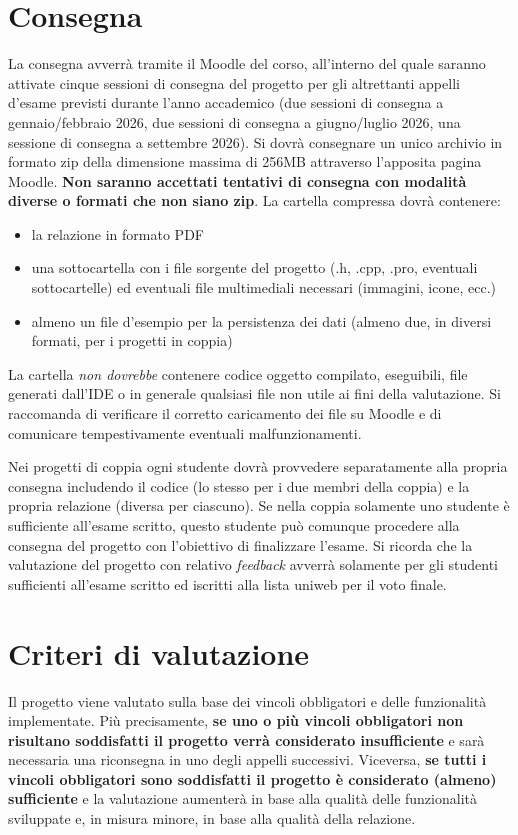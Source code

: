 \documentclass[10pt,a4paper,oneside]{article}
\begin{document}
\section{Consegna}
La consegna avverrà tramite il Moodle del corso, all'interno del quale saranno attivate cinque sessioni di consegna del progetto per gli altrettanti appelli d'esame previsti durante l'anno accademico (due sessioni di consegna a gennaio/febbraio 2026, due sessioni di consegna a giugno/luglio 2026, una sessione di consegna a settembre 2026). Si dovrà consegnare un unico archivio in formato zip della dimensione massima di 256MB attraverso l'apposita pagina Moodle. \textbf{Non saranno accettati tentativi di consegna con modalità diverse o formati che non siano zip}. La cartella compressa dovrà contenere:
\begin{itemize}
 \item la relazione in formato PDF
 \item una sottocartella con i file sorgente del progetto (.h, .cpp, .pro, eventuali sottocartelle) ed eventuali file multimediali necessari (immagini, icone, ecc.)
 \item almeno un file d'esempio per la persistenza dei dati (almeno due, in diversi formati, per i progetti in coppia)
\end{itemize}
La cartella \emph{non dovrebbe} contenere codice oggetto compilato, eseguibili, file generati dall'IDE o in generale qualsiasi file non utile ai fini della valutazione. Si raccomanda di verificare il corretto caricamento dei file su Moodle e di comunicare tempestivamente eventuali malfunzionamenti.

Nei progetti di coppia ogni studente dovrà provvedere separatamente alla propria consegna includendo il codice (lo stesso per i due membri della coppia) e la propria relazione (diversa per ciascuno). Se nella coppia solamente uno studente è sufficiente all'esame scritto, questo studente può comunque procedere alla consegna del progetto con l'obiettivo di finalizzare l'esame. Si ricorda che la valutazione del progetto con relativo \emph{feedback} avverrà solamente per gli studenti sufficienti all'esame scritto ed iscritti alla lista uniweb per il voto finale.


\section{Criteri di valutazione}
Il progetto viene valutato sulla base dei vincoli obbligatori e delle funzionalità implementate. Più precisamente, \textbf{se uno o più vincoli obbligatori non risultano soddisfatti il progetto verrà considerato insufficiente} e sarà necessaria una riconsegna in uno degli appelli successivi. Viceversa, \textbf{se tutti i vincoli obbligatori sono soddisfatti il progetto è considerato (almeno) sufficiente} e la valutazione aumenterà in base alla qualità delle funzionalità sviluppate e, in misura minore, in base alla qualità della relazione.
\end{document}

